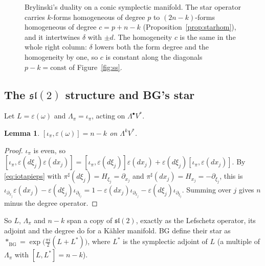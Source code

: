 \documentclass[11pt,oneside,reqno]{article}
\newcommand{\Om}{\Omega}
\newcommand{\eps}{\varepsilon}
\newcommand{\pa}{\partial}
\theoremstyle{plain}
\newtheorem{lemma}[theorem]{Lemma}
\theoremstyle{definition}
\theoremstyle{remark}
\begin{document}
\begin{figure}[htbp]
\centering
{}
\caption[The \(\delta\)/\(d\) duality]{Brylinski's duality on a conic
symplectic manifold. The star operator carries \(k\)-forms homogeneous of degree
\(p\) to \((2n-k)\)-forms homogeneous of degree \(c=p+n-k\)
(Proposition~\ref{prop:starhom}), and it intertwines \(\delta\) with \(\pm d\). The
homogeneity \(c\) is the same in the whole right column: \(\delta\) lowers both the
form degree and the homogeneity by one, so \(c\) is constant along the
diagonals \(p-k=\mathrm{const}\) of Figure~\ref{fig:ss}.}
\label{fig:duality}
\end{figure}

\subsection{The \texorpdfstring{\(\mathfrak{sl}(2)\)}{sl(2)} structure and BG's star}
\label{subsec:sl2}
Let \(L=\eps(\omega)\) and \(\Lambda_\pi=\iota_\pi\), acting on \(\Lambda^\bullet V^*\).

\begin{lemma}\label{lem:sl2}
\([\iota_\pi,\eps(\omega)]=n-k\) on \(\Lambda^kV^*\).
\end{lemma}

\begin{proof}
\(\iota_\pi\) is even, so \([\iota_\pi,\eps(d\xi_j)\eps(dx_j)]=
[\iota_\pi,\eps(d\xi_j)]\eps(dx_j)+\eps(d\xi_j)[\iota_\pi,\eps(dx_j)]\). By
\eqref{eq:iotapieps} with \(\pi^\sharp(d\xi_j)=H_{\xi_j}=\pa_{x_j}\) and
\(\pi^\sharp(dx_j)=H_{x_j}=-\pa_{\xi_j}\), this is
\(\iota_{\pa_{x_j}}\eps(dx_j)-\eps(d\xi_j)\iota_{\pa_{\xi_j}}=1-\eps(dx_j)\iota_{\pa_{x_j}}
-\eps(d\xi_j)\iota_{\pa_{\xi_j}}\). Summing over \(j\) gives \(n\) minus the degree
operator.
\end{proof}

So \(L\), \(\Lambda_\pi\) and \(n-k\) span a copy of \(\mathfrak{sl}(2)\), exactly as the
Lefschetz operator, its adjoint and the degree do for a Kähler manifold.
BG define their star as \(*_{\mathrm{BG}}=\exp\bigl(\tfrac{\pi i}2(L+L^*)\bigr)\),
where \(L^*\) is the symplectic adjoint of \(L\) (a multiple of \(\Lambda_\pi\) with
\([L,L^*]=n-k\)).
\end{document}
